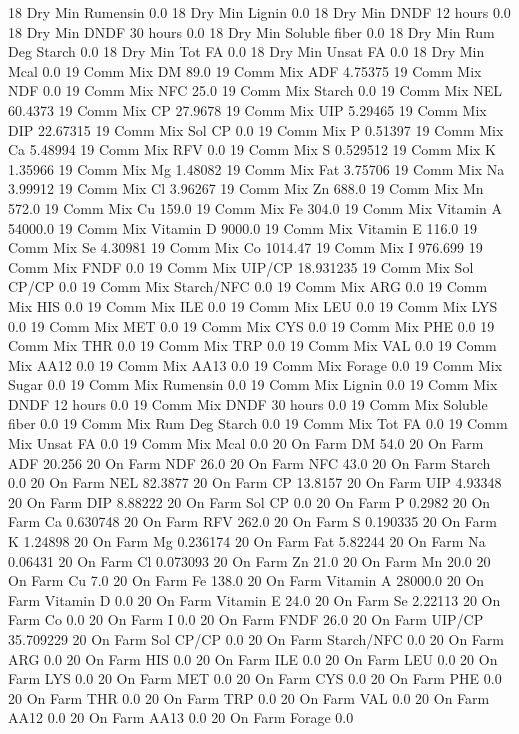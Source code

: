 \documentclass[letterpaper,10pt,english]{sphinxmanual}
\begin{document}
\begin{sphinxVerbatim}[commandchars=\\\{\},numbers=left,firstnumber=1,stepnumber=1]
18 Dry Min Rumensin 0.0
18 Dry Min Lignin 0.0
18 Dry Min DNDF 12 hours 0.0
18 Dry Min DNDF 30 hours 0.0
18 Dry Min Soluble fiber 0.0
18 Dry Min Rum Deg Starch 0.0
18 Dry Min Tot FA 0.0
18 Dry Min Unsat FA 0.0
18 Dry Min Mcal 0.0
19 Comm Mix DM 89.0
19 Comm Mix ADF 4.75375
19 Comm Mix NDF 0.0
19 Comm Mix NFC 25.0
19 Comm Mix Starch 0.0
19 Comm Mix NEL 60.4373
19 Comm Mix CP 27.9678
19 Comm Mix UIP 5.29465
19 Comm Mix DIP 22.67315
19 Comm Mix Sol CP 0.0
19 Comm Mix P 0.51397
19 Comm Mix Ca 5.48994
19 Comm Mix RFV 0.0
19 Comm Mix S 0.529512
19 Comm Mix K 1.35966
19 Comm Mix Mg 1.48082
19 Comm Mix Fat 3.75706
19 Comm Mix Na 3.99912
19 Comm Mix Cl 3.96267
19 Comm Mix Zn 688.0
19 Comm Mix Mn 572.0
19 Comm Mix Cu 159.0
19 Comm Mix Fe 304.0
19 Comm Mix Vitamin A 54000.0
19 Comm Mix Vitamin D 9000.0
19 Comm Mix Vitamin E 116.0
19 Comm Mix Se 4.30981
19 Comm Mix Co 1014.47
19 Comm Mix I 976.699
19 Comm Mix FNDF 0.0
19 Comm Mix UIP/CP 18.931235
19 Comm Mix Sol CP/CP 0.0
19 Comm Mix Starch/NFC 0.0
19 Comm Mix ARG 0.0
19 Comm Mix HIS 0.0
19 Comm Mix ILE 0.0
19 Comm Mix LEU 0.0
19 Comm Mix LYS 0.0
19 Comm Mix MET 0.0
19 Comm Mix CYS 0.0
19 Comm Mix PHE 0.0
19 Comm Mix THR 0.0
19 Comm Mix TRP 0.0
19 Comm Mix VAL 0.0
19 Comm Mix AA\PYGZsh{}12 0.0
19 Comm Mix AA\PYGZsh{}13 0.0
19 Comm Mix \PYGZpc{} Forage 0.0
19 Comm Mix Sugar \PYGZpc{} 0.0
19 Comm Mix Rumensin 0.0
19 Comm Mix Lignin 0.0
19 Comm Mix DNDF 12 hours 0.0
19 Comm Mix DNDF 30 hours 0.0
19 Comm Mix Soluble fiber 0.0
19 Comm Mix Rum Deg Starch 0.0
19 Comm Mix Tot FA 0.0
19 Comm Mix Unsat FA 0.0
19 Comm Mix Mcal 0.0
20 On Farm DM 54.0
20 On Farm ADF 20.256
20 On Farm NDF 26.0
20 On Farm NFC 43.0
20 On Farm Starch 0.0
20 On Farm NEL 82.3877
20 On Farm CP 13.8157
20 On Farm UIP 4.93348
20 On Farm DIP 8.88222
20 On Farm Sol CP 0.0
20 On Farm P 0.2982
20 On Farm Ca 0.630748
20 On Farm RFV 262.0
20 On Farm S 0.190335
20 On Farm K 1.24898
20 On Farm Mg 0.236174
20 On Farm Fat 5.82244
20 On Farm Na 0.06431
20 On Farm Cl 0.073093
20 On Farm Zn 21.0
20 On Farm Mn 20.0
20 On Farm Cu 7.0
20 On Farm Fe 138.0
20 On Farm Vitamin A 28000.0
20 On Farm Vitamin D 0.0
20 On Farm Vitamin E 24.0
20 On Farm Se 2.22113
20 On Farm Co 0.0
20 On Farm I 0.0
20 On Farm FNDF 26.0
20 On Farm UIP/CP 35.709229
20 On Farm Sol CP/CP 0.0
20 On Farm Starch/NFC 0.0
20 On Farm ARG 0.0
20 On Farm HIS 0.0
20 On Farm ILE 0.0
20 On Farm LEU 0.0
20 On Farm LYS 0.0
20 On Farm MET 0.0
20 On Farm CYS 0.0
20 On Farm PHE 0.0
20 On Farm THR 0.0
20 On Farm TRP 0.0
20 On Farm VAL 0.0
20 On Farm AA\PYGZsh{}12 0.0
20 On Farm AA\PYGZsh{}13 0.0
20 On Farm \PYGZpc{} Forage 0.0

\end{sphinxVerbatim}
\end{document}
